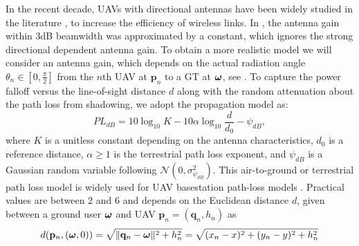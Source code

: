 \documentclass[smallabstract,smallcaptions]{dccpaper}
\renewcommand{\vq}{\mathbf p}
\renewcommand{\vp}{\mathbf q}
\renewcommand{\vP}{\mathbf Q}
\newcommand{\bH}{\ensuremath{\vh}}          %
\begin{document}
In the recent decade, UAVs with directional
antennas have been widely studied in the literature \cite{BJL,MSF,HA,KMR,HSYR,MWMM}, to increase the efficiency of wireless
links.   In \cite{BJL,MSF,HA,KMR,HSYR,MWMM}, the antenna gain within 3dB beamwidth was approximated by a constant, which
ignores  the strong directional dependent antenna gain. To
obtain a more realistic model we will consider an antenna gain, which depends on the actual radiation angle
$\theta_n\in[0,\frac{\pi}{2}]$ from the $n$th UAV at $\vq_n$ to a GT at $\boldsymbol{ \omega}$,
see .
%
%
%
%
To capture the power falloff versus the line-of-sight distance $d$
along with the random attenuation about the path loss from shadowing, we adopt the propagation model \cite[(2.51)]{Gol05}
as:
%
\begin{equation}
  PL_{dB}=10\log_{10}{K}-10\alpha\log_{10}{\frac{d}{d_0}}-\psi_{dB},
\end{equation}
%
where $K$ is a unitless constant depending on the antenna characteristics, $d_0$ is a reference distance, $\alpha\geq 1$
is the terrestrial path loss exponent, and $\psi_{dB}$ is a Gaussian random variable following
$\mathcal{N}\left(0,\sigma^2_{\psi_{dB}}\right)$. This air-to-ground or terrestrial path loss model is widely used for
UAV basestation path-loss models \cite{MSBD16a}. Practical values are between $2$ and $6$ and depends on the Euclidean
distance $d$, given between a ground user $\boldsymbol{ \omega}$ and UAV $\vq_n=(\vp_n,h_n)$ as
%
\begin{align}
  d(\vq_n,(\vome,0))=\sqrt{\|\vp_n-\vome\|^2+h_n^2}=\sqrt{(x_n-x)^2+(y_n-y)^2+h_n^2}\label{eq:eucd}
\end{align}
\end{document}
